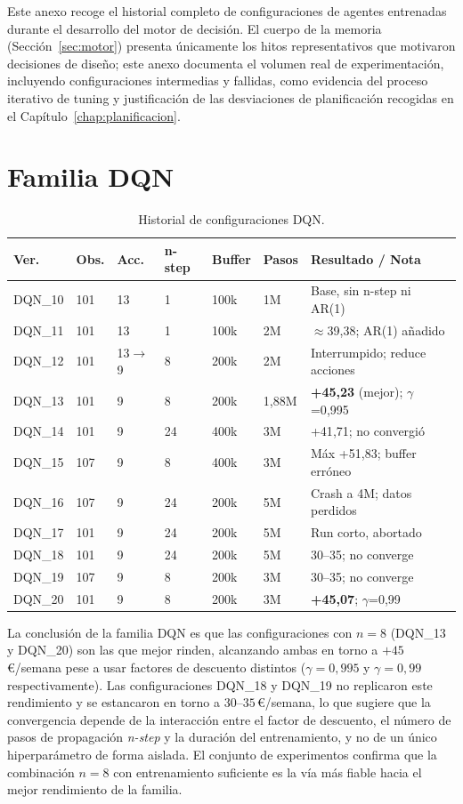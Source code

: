 \documentclass[12pt, a4paper, twoside]{report}
\begin{document}
Este anexo recoge el historial completo de configuraciones de agentes
entrenadas durante el desarrollo del motor de decisión. El cuerpo de la memoria
(Sección~\ref{sec:motor}) presenta únicamente los hitos representativos que
motivaron decisiones de diseño; este anexo documenta el volumen real de
experimentación, incluyendo configuraciones intermedias y fallidas, como
evidencia del proceso iterativo de tuning y justificación de las desviaciones
de planificación recogidas en el Capítulo~\ref{chap:planificacion}.

\section{Familia DQN}

\begin{table}[H]
\centering
\caption{Historial de configuraciones DQN.}
\label{tab:hist_dqn}
\small
\begin{tabularx}{\textwidth}{lL{1.4cm}L{1cm}L{1.3cm}L{1.2cm}L{1.3cm}X}
\toprule
\textbf{Ver.} & \textbf{Obs.} & \textbf{Acc.} & \textbf{n-step} &
\textbf{Buffer} & \textbf{Pasos} & \textbf{Resultado / Nota} \\
\midrule
DQN\_10 & 101 & 13 & 1 & 100k & 1M & Base, sin n-step ni AR(1) \\
DQN\_11 & 101 & 13 & 1 & 100k & 2M & $\approx$39{,}38; AR(1) añadido \\
DQN\_12 & 101 & 13$\to$9 & 8 & 200k & 2M & Interrumpido; reduce acciones \\
DQN\_13 & 101 & 9 & 8 & 200k & 1{,}88M & \textbf{+45{,}23} (mejor); $\gamma$=0{,}995 \\
DQN\_14 & 101 & 9 & 24 & 400k & 3M & +41{,}71; no convergió \\
DQN\_15 & 107 & 9 & 8 & 400k & 3M & Máx +51{,}83; buffer erróneo \\
DQN\_16 & 107 & 9 & 24 & 200k & 5M & Crash a 4M; datos perdidos \\
DQN\_17 & 101 & 9 & 24 & 200k & 5M & Run corto, abortado \\
DQN\_18 & 101 & 9 & 24 & 200k & 5M & 30--35; no converge \\
DQN\_19 & 107 & 9 & 8 & 200k & 3M & 30--35; no converge \\
DQN\_20 & 101 & 9 & 8 & 200k & 3M & \textbf{+45{,}07}; $\gamma$=0{,}99 \\
\bottomrule
\end{tabularx}
\end{table}

La conclusión de la familia DQN es que las configuraciones con $n=8$ (DQN\_13 y
DQN\_20) son las que mejor rinden, alcanzando ambas en torno a
$+45$\,€/semana pese a usar factores de descuento distintos ($\gamma=0{,}995$ y
$\gamma=0{,}99$ respectivamente). Las configuraciones DQN\_18 y DQN\_19 no
replicaron este rendimiento y se estancaron en torno a $30$--$35$\,€/semana, lo
que sugiere que la convergencia depende de la interacción entre el factor de
descuento, el número de pasos de propagación \textit{n-step} y la duración del
entrenamiento, y no de un único hiperparámetro de forma aislada. El conjunto de
experimentos confirma que la combinación $n=8$ con entrenamiento suficiente es
la vía más fiable hacia el mejor rendimiento de la familia.
\end{document}
